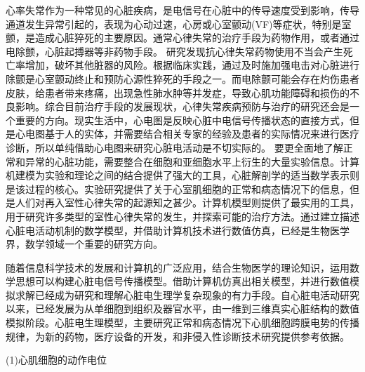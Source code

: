\documentclass[twoside,UTF8]{nputhesis}
\begin{document}
心率失常作为一种常见的心脏疾病，是电信号在心脏中的传导速度受到影响，传导通道发生异常引起的，表现为心动过速，心房或心室颤动(VF)等症状\cite{broken1999,broken1994}，特别是室颤，是造成心脏猝死的主要原因。通常心律失常的治疗手段为药物作用，或者通过电除颤，心脏起搏器等非药物手段。
研究发现抗心律失常药物使用不当会产生死亡率增加，破坏其他脏器的风险\cite{china2004}。根据临床实践，通过及时施加强电击对心脏进行除颤是心室颤动终止和预防心源性猝死的手段之一。而电除颤可能会存在灼伤患者皮肤，给患者带来疼痛，出现急性肺水肿等并发症\cite{dian2004}，导致心肌功能障碍和损伤的不良影响。综合目前治疗手段的发展现状，心律失常疾病预防与治疗的研究还会是一个重要的方向。现实生活中，心电图是反映心脏中电信号传播状态的直接方式，但是心电图基于人的实体，并需要结合相关专家的经验及患者的实际情况来进行医疗诊断，所以单纯借助心电图来研究心脏电活动是不切实际的。
要更全面地了解正常和异常的心脏功能，需要整合在细胞和亚细胞水平上衍生的大量实验信息。计算机建模为实验和理论之间的结合提供了强大的工具，心脏解剖学的适当数学表示则是该过程的核心。实验研究提供了关于心室肌细胞的正常和病态情况下的信息，但是人们对再入室性心律失常的起源知之甚少。计算机模型则提供了最实用的工具，用于研究许多类型的室性心律失常的发生，并探索可能的治疗方法。通过建立描述心脏电活动机制的数学模型，并借助计算机技术进行数值仿真，已经是生物医学界，数学领域一个重要的研究方向。

随着信息科学技术的发展和计算机的广泛应用，结合生物医学的理论知识，运用数学思想可以构建心脏电信号传播模型。借助计算机仿真出相关模型，并进行数值模拟求解已经成为研究和理解心脏电生理学复杂现象的有力手段\cite{Bernus2002,Ten2006,Nickerson2010,Shuaiby2013,Groenendaal2015}。自心脏电活动研究以来，已经发展为从单细胞到组织及器官水平，由一维到三维真实心脏结构的数值模拟阶段。心脏电生理模型，主要研究正常和病态情况下心肌细胞跨膜电势的传播规律，为新的药物，医疗设备的开发，和非侵入性诊断技术研究提供参考依据。

(1)心肌细胞的动作电位
\end{document}
